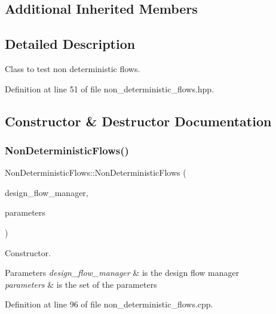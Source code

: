 \subsection*{Additional Inherited Members}


\subsection{Detailed Description}
Class to test non deterministic flows. 

Definition at line 51 of file non\+\_\+deterministic\+\_\+flows.\+hpp.



\subsection{Constructor \& Destructor Documentation}
\mbox{\label{classNonDeterministicFlows_a2c17dbfcd2cd248e3b3b4f3c6b79aeb0}} 
\subsubsection{\texorpdfstring{Non\+Deterministic\+Flows()}{NonDeterministicFlows()}}
{\footnotesize\ttfamily Non\+Deterministic\+Flows\+::\+Non\+Deterministic\+Flows (\begin{DoxyParamCaption}\item[{const Design\+Flow\+Manager\+Const\+Ref}]{design\+\_\+flow\+\_\+manager,  }\item[{const \hyperlink{Parameter_8hpp_a37841774a6fcb479b597fdf8955eb4ea}{Parameter\+Const\+Ref}}]{parameters }\end{DoxyParamCaption})}



Constructor. 


\begin{DoxyParams}{Parameters}
{\em design\+\_\+flow\+\_\+manager} & is the design flow manager \\
\hline
{\em parameters} & is the set of the parameters \\
\hline
\end{DoxyParams}


Definition at line 96 of file non\+\_\+deterministic\+\_\+flows.\+cpp.



